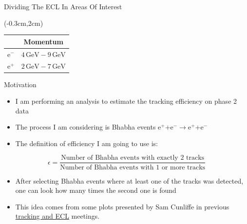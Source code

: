 \documentclass[8pt]{beamer}
\begin{document}
\begin{frame}{Dividing The ECL In Areas Of Interest}
	
	\pause[1]
	
	\begin{textblock*}{5cm}(-0.3cm,2cm)
	
	\begin{table}[h!]
		\centering
		\begin{tabular}{lc}
			&Momentum\\
			\hline
			$\textrm{e}^-$& $4\,\textrm{GeV} - 9\,\textrm{GeV}$\\	
			\pause[2]
			$\textrm{e}^+$& $2\,\textrm{GeV} - 7\,\textrm{GeV}$\\	
		\end{tabular}
		
	\end{table}
\end{textblock*}
\end{frame}











\begin{frame}{Motivation}

\begin{itemize}	
	\item I am performing an analysis to estimate the tracking efficiency on phase 2 data
	\item The process I am considering is Bhabha events $\textrm{e}^+ \textrm{+e}^- \rightarrow \textrm{e}^+ \textrm{+e}^- $ 
	\item The definition of efficiency I am going to use is:

\end{itemize}
	\begin{equation*}
		\epsilon = \frac{\textrm{Number of Bhabha events with exactly 2 tracks}}{\textrm{Number of Bhabha events with 1 or more tracks}}
	\end{equation*}
	
	\begin{itemize}
		\item After selecting Bhabha events where at least one of the tracks was detected, one can look how many times the second one is found
		\item  This idea comes from some plots presented by Sam Cunliffe in previous  \href{https://confluence.desy.de/display/BI/ECL+Meetings?preview=/84320165/109161400/SCunliffe181123-ECL.pdf}{tracking and ECL} meetings.
	\end{itemize}





\end{frame}
	
\end{document}
